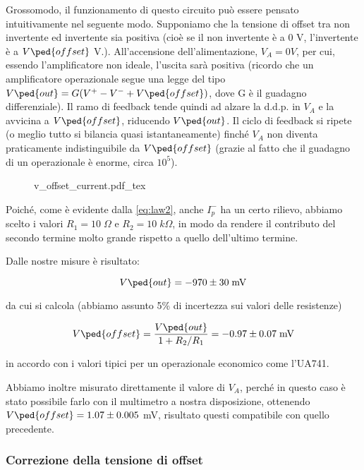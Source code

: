 Grossomodo, il funzionamento di questo circuito può essere pensato intuitivamente nel seguente modo.
Supponiamo che la tensione di offset tra non invertente ed invertente sia positiva (cioè se il non invertente è a 0 V, l'invertente è a $V\ped{offset}$ V.).
All'accensione dell'alimentazione,
$V_A = 0 V$, per cui, essendo l'amplificatore non ideale, l'uscita sarà positiva (ricordo che un amplificatore
operazionale segue una legge del tipo $V\ped{out} = G(V^+ - V^- + V\ped{offset})$, dove G è il guadagno differenziale).
Il ramo di feedback tende quindi ad alzare la d.d.p. in $V_A$ e la avvicina a $V\ped{offset}$, riducendo $V\ped{out}$.
Il ciclo di feedback si ripete (o meglio tutto si bilancia quasi istantaneamente) finché $V_A$ non diventa praticamente
indistinguibile da $V\ped{offset}$ (grazie al fatto che il guadagno di un operazionale è enorme, circa $10^5$).

\begin{figure}[t]
    \def\svgwidth{0.5\textwidth}
    {v_offset_current.pdf_tex}
    \caption{ }
    \label{fig:circ_con_corr2}
\end{figure}

Poiché, come è evidente dalla \eqref{eq:law2}, anche $I_p^-$ ha un certo rilievo, abbiamo scelto i
valori $R_1 = 10 \; \Omega$ e $R_2 = 10 \; k\Omega$, in modo da rendere il contributo del secondo termine molto
grande rispetto a quello dell'ultimo termine.

Dalle nostre misure è risultato:

\begin{equation}
    V\ped{out} = - 970 \pm 30 \;\si{\milli\volt} 
\end{equation}

da cui si calcola (abbiamo assunto 5\% di incertezza sui valori delle resistenze)

\begin{equation}
    V\ped{offset} = \frac{V\ped{out}}{1 + R_2/R_1} = - 0.97 \pm 0.07 \; \si{\milli\volt}
\end{equation}

in accordo con i valori tipici per un operazionale economico come l'UA741.

Abbiamo inoltre misurato direttamente il valore di $V_A$, perché in questo caso è stato possibile
farlo con il multimetro a nostra disposizione, ottenendo $V\ped{offset} = 1.07 \pm 0.005$ mV, risultato
questi compatibile con quello precedente.

\subsubsection{Correzione della tensione di offset}

